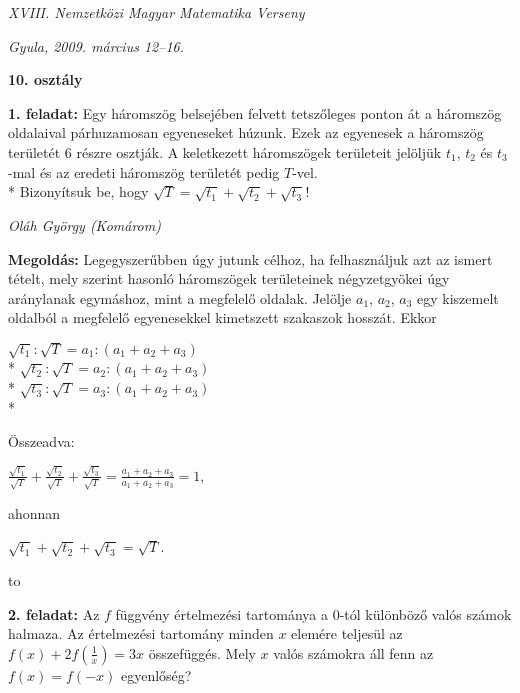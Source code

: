 \documentclass[a4paper,10pt]{article}
\def\ki#1#2{\hfill {\it #1 (#2)}\medskip}
\begin{document}
\begin{center} \Large {\em XVIII. Nemzetközi Magyar Matematika Verseny} \end{center}
\begin{center} \large{\em Gyula, 2009. március 12--16. } \end{center}
\smallskip
\begin{center} \large{\bf 10. osztály} \end{center}
\bigskip 


{\bf 1. feladat:} Egy háromszög belsejében felvett tetszőleges ponton át a háromszög oldalaival párhuzamosan egyeneseket húzunk. Ezek az egyenesek a háromszög területét 6 részre osztják. A keletkezett háromszögek területeit jelöljük $t_1$, $t_2$ és $t_3$-mal és az eredeti háromszög területét pedig $T$-vel. \\*
Bizonyítsuk be, hogy $\sqrt{T}=\sqrt{t_1}+\sqrt{t_2}+\sqrt{t_3}$!

\ki{Oláh György}{Komárom}\medskip

{\bf Megoldás: } Legegyszerűbben úgy jutunk célhoz, ha felhasználjuk azt az ismert tételt, mely szerint hasonló háromszögek területeinek négyzetgyökei úgy aránylanak egymáshoz, mint a megfelelő oldalak. Jelölje $a_1$, $a_2$, $a_3$ egy kiszemelt oldalból a megfelelő egyenesekkel kimetszett szakaszok hosszát. Ekkor

\begin{center}
$\sqrt{t_1}:\sqrt{T}=a_1:(a_1+a_2+a_3)$ \\*
$\sqrt{t_2}:\sqrt{T}=a_2:(a_1+a_2+a_3)$ \\*
$\sqrt{t_3}:\sqrt{T}=a_3:(a_1+a_2+a_3)$ \\*
\end{center}

Összeadva:

\begin{center}
$\frac{\sqrt{t_1}}{\sqrt{T}}+\frac{\sqrt{t_2}}{\sqrt{T}}+\frac{\sqrt{t_3}}{\sqrt{T}}=\frac{a_1+a_2+a_3}{a_1+a_2+a_3}=1$,
\end{center}

ahonnan

\begin{center}
$\sqrt{t_1}+\sqrt{t_2}+\sqrt{t_3}=\sqrt{T}$.
\end{center}
\medskip
\hbox to 

{\bf 2. feladat:} Az $f$ függvény értelmezési tartománya a 0-tól különböző valós számok halmaza. Az értelmezési tartomány minden $x$ elemére teljesül az $f(x)+2f(\frac{1}{x})=3x$ összefüggés. Mely $x$ valós számokra áll fenn az $f(x)=f(-x)$ egyenlőség?
\end{document}
